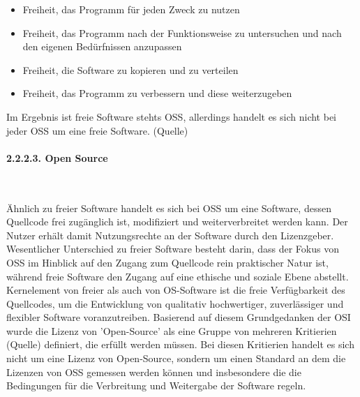 \begin{itemize}
    \item Freiheit, das Programm für jeden Zweck zu nutzen
    \item Freiheit, das Programm nach der Funktionsweise zu untersuchen und nach den eigenen Bedürfnissen anzupassen
    \item Freiheit, die Software zu kopieren und zu verteilen
    \item Freiheit, das Programm zu verbessern und diese weiterzugeben
\end{itemize}

Im Ergebnis ist freie Software stehts OSS, allerdings handelt es sich nicht bei jeder OSS um eine freie Software. (Quelle)

\paragraph{2.2.2.3. Open Source}$~$

Ähnlich zu freier Software handelt es sich bei OSS um eine Software, dessen Quellcode frei zugänglich ist, modifiziert und weiterverbreitet werden kann. Der Nutzer erhält damit Nutzungsrechte an der Software durch den Lizenzgeber. Wesentlicher Unterschied zu freier Software besteht darin, dass der Fokus von OSS im Hinblick auf den Zugang zum Quellcode rein praktischer Natur ist, während freie Software den Zugang auf eine ethische und soziale Ebene abstellt. \cite[S. 28]{kees_open_2015} Kernelement von freier als auch von OS-Software ist die freie Verfügbarkeit des Quellcodes, um die Entwicklung von qualitativ hochwertiger, zuverlässiger und flexibler Software voranzutreiben. Basierend auf diesem Grundgedanken der OSI wurde die Lizenz von 'Open-Source' als eine Gruppe von mehreren Kritierien (Quelle) definiert, die erfüllt werden müssen. Bei diesen Kritierien handelt es sich nicht um eine Lizenz von Open-Source, sondern um einen Standard an dem die Lizenzen von OSS gemessen werden können und insbesondere die die Bedingungen für die Verbreitung und Weitergabe der Software regeln. 

